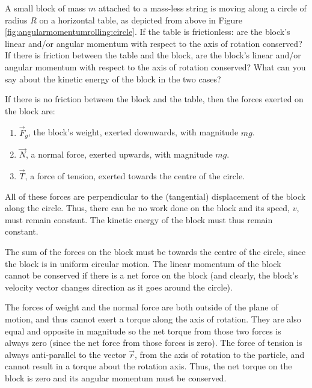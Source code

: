 \vspace{-0.35cm}
\begin{example}{
A small block of mass $m$ attached to a mass-less string is moving along a circle of radius $R$ on a horizontal table, as depicted from above in Figure \ref{fig:angularmomentumrolling:circle}. If the table is frictionless: are the block's linear and/or angular momentum with respect to the axis of rotation conserved? If there is friction between the table and the block, are the block's linear and/or angular momentum with respect to the axis of rotation conserved? What can you say about the kinetic energy of the block in the two cases?}

If there is no friction between the block and the table, then the forces exerted on the block are:
\begin{enumerate}
\item $\vec F_g$, the block's weight, exerted downwards, with magnitude $mg$.
\item $\vec N$, a normal force, exerted upwards, with magnitude $mg$.
\item $\vec T$, a force of tension, exerted towards the centre of the circle.
\end{enumerate}
All of these forces are perpendicular to the (tangential) displacement of the block along the circle. Thus, there can be no work done on the block and its speed, $v$, must remain constant. The kinetic energy of the block must thus remain constant.

The sum of the forces on the block must be towards the centre of the circle, since the block is in uniform circular motion. The linear momentum of the block cannot be conserved if there is a net force on the block (and clearly, the block's velocity vector changes direction as it goes around the circle). 

The forces of weight and the normal force are both outside of the plane of motion, and thus cannot exert a torque along the axis of rotation. They are also equal and opposite in magnitude so the net torque from those two forces is always zero (since the net force from those forces is zero). The force of tension is always anti-parallel to the vector $\vec r$, from the axis of rotation to the particle, and cannot result in a torque about the rotation axis. Thus, the net torque on the block is zero and its angular momentum must be conserved. 


\end{example}
